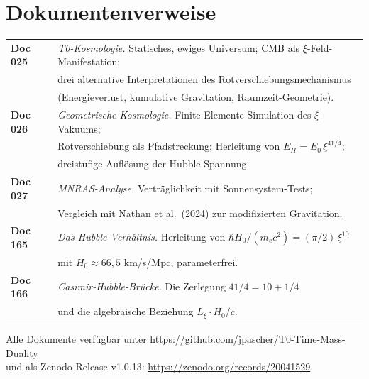 \documentclass[11pt,a4paper]{article}
\begin{document}
\section*{Dokumentenverweise}

\noindent\small\begin{tabular}{ll}
\textbf{Doc 025} & \emph{T0-Kosmologie.} Statisches, ewiges Universum; CMB als $\xi$-Feld-Manifestation; \\
& drei alternative Interpretationen des Rotverschiebungsmechanismus \\
& (Energieverlust, kumulative Gravitation, Raumzeit-Geometrie). \\[2pt]
\textbf{Doc 026} & \emph{Geometrische Kosmologie.} Finite-Elemente-Simulation des $\xi$-Vakuums; \\
& Rotverschiebung als Pfadstreckung; Herleitung von $E_H = E_0\,\xi^{41/4}$; \\
& dreistufige Auflösung der Hubble-Spannung. \\[2pt]
\textbf{Doc 027} & \emph{MNRAS-Analyse.} Verträglichkeit mit Sonnensystem-Tests; \\
& Vergleich mit Nathan et al.\ (2024) zur modifizierten Gravitation. \\[2pt]
\textbf{Doc 165} & \emph{Das Hubble-Verhältnis.} Herleitung von $\hbar H_0/(m_e c^2) = (\pi/2)\,\xi^{10}$ \\
& mit $H_0 \approx 66{,}5$ km/s/Mpc, parameterfrei. \\[2pt]
\textbf{Doc 166} & \emph{Casimir-Hubble-Brücke.} Die Zerlegung $41/4 = 10 + 1/4$ \\
& und die algebraische Beziehung $L_\xi \cdot H_0/c$. \\
\end{tabular}

\medskip
Alle Dokumente verfügbar unter \url{https://github.com/jpascher/T0-Time-Mass-Duality}\\
und als Zenodo-Release v1.0.13: \url{https://zenodo.org/records/20041529}.
\end{document}
